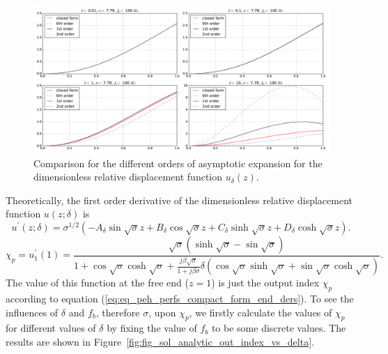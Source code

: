 \documentclass{article}
\begin{document}
\begin{figure}[!htbp]
    \centering
    \includegraphics[width=\textwidth]{./img_eig_asy/fig_sol_analytic_disp_cmp_fr100}
    \caption{Comparison for the different orders of asymptotic expansion for the dimensionless relative displacement function $u_\delta(z)$.}
    \label{fig:fig_sol_analytic_disp_cmp_fr100}
\end{figure}


Theoretically, the first order derivative of the dimensionless relative displacement function $u(z;\delta)$ is 
\begin{equation}
    u^{\prime}(z;\delta) = \sigma^{1/2} \left( - A_\delta \sin{\sqrt{\sigma}z} + B_\delta \cos{\sqrt{\sigma}z} + C_\delta \sinh{\sqrt{\sigma}z} + D_\delta \cosh{\sqrt{\sigma}z} \right).
\end{equation}
\begin{equation}
    \chi_p = u_1^\prime(1) = \frac{ \sqrt{\sigma} \left( \sinh\sqrt{\sigma} - \sin\sqrt{\sigma} \right) }{ 1 + \cos\sqrt{\sigma } \cosh\sqrt{\sigma } + \frac{j \beta \sqrt{\sigma}}{ 1+ j \beta \sigma } \delta \left( \cos\sqrt{\sigma } \sinh\sqrt{\sigma } + \sin\sqrt{\sigma } \cosh\sqrt{\sigma } \right) }.
    \label{eq:eq_peh_perfs_compact_form_end_ders1}
\end{equation}
The value of this function at the free end ($z=1$) is just the output index $\chi_p$ according to equation (\ref{eq:eq_peh_perfs_compact_form_end_ders}). To see the influences of $\delta$ and $f_b$, therefore $\sigma$, upon $\chi_p$, we firstly calculate the values of $\chi_p$ for different values of $\delta$ by fixing the value of $f_b$ to be some discrete values. The results are shown in Figure~\ref{fig:fig_sol_analytic_out_index_vs_delta}. 
\end{document}
